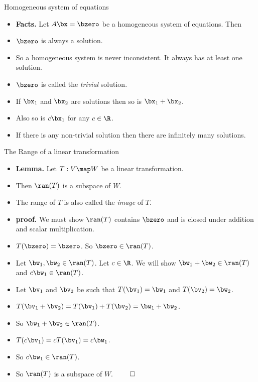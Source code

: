 \documentclass{beamer}
\begin{document}
\begin{frame}{Homogeneous system of equations}

\begin{itemize}
\item \textbf{Facts.} Let $A\bx=\bzero$ be a homogeneous system of equations. Then
\item $\bzero$ is always a solution.
\item So a homogeneous system is never inconsistent. It always has at least one solution.
\item $\bzero$ is called the \emph{trivial} solution.
\item If $\bx_1$ and $\bx_2$ are solutions then so is $\bx_1+\bx_2$.
\item Also so is $c\bx_1$ for any $c\in\R$.
\item If there is any non-trivial solution then there are infinitely many solutions.
\end{itemize}

\end{frame}


\begin{frame}{The Range of a linear transformation}

\begin{itemize}
\item \textbf{Lemma.} Let $T:V\map W$ be a linear transformation.
\item Then $\ran(T)$ is a subspace of $W$.
\item The range of $T$ is also called the \emph{image} of $T$.
\item \textbf{proof.} We must show $\ran(T)$ contains $\bzero$ and is closed
under addition and scalar multiplication.
\item $T(\bzero) = \bzero$. So $\bzero\in\ran(T)$.
\item Let $\bw_1,\bw_2\in\ran(T)$. Let $c\in\R$. We will show $\bw_1+\bw_2\in\ran(T)$ and $c\bw_1\in\ran(T)$.
\item Let $\bv_1$ and $\bv_2$ be such that $T(\bv_1)=\bw_1$ and $T(\bv_2)=\bw_2$.
\item $T(\bv_1+\bv_2)=T(\bv_1) + T(\bv_2) = \bw_1+\bw_2$.
\item So $\bw_1+\bw_2\in\ran(T)$.
\item $T(c\bv_1)=cT(\bv_1)=c\bw_1$.
\item So $c\bw_1\in\ran(T)$.
\item So $\ran(T)$ is a subspace of $W$. $\qed$
\end{itemize}

\end{frame}
\end{document}
